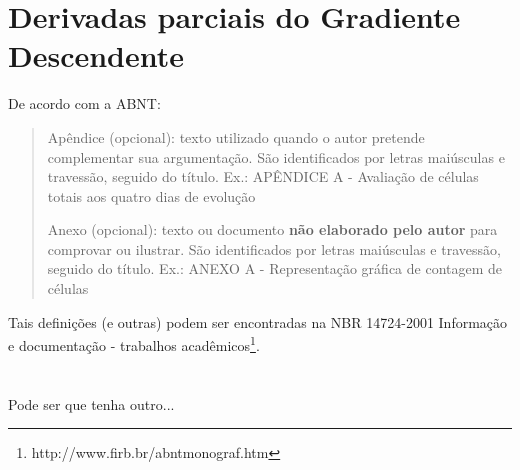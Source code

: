 \begin{apendicesenv}

\partapendices



\chapter{Derivadas parciais do Gradiente Descendente}\label{app:derivadasgraddesc}

De acordo com a ABNT:

\begin{quotation}
Apêndice (opcional): texto utilizado quando o autor pretende complementar sua argumentação. São identificados por letras maiúsculas e travessão, seguido do título. Ex.: APÊNDICE A - Avaliação de células totais aos quatro dias de evolução

Anexo (opcional): texto ou documento \textbf{não elaborado pelo autor} para comprovar ou ilustrar. São identificados por letras maiúsculas e travessão, seguido do título. Ex.: ANEXO A - Representação gráfica de contagem de células
\end{quotation}

Tais definições (e outras) podem ser encontradas na NBR 14724-2001 Informação e documentação - trabalhos acadêmicos\footnote{http://www.firb.br/abntmonograf.htm}.


\chapter{}

Pode ser que tenha outro...


\end{apendicesenv}
